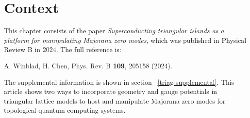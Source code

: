 \section{Context}

This chapter consists of the paper \textit{Superconducting triangular islands as a platform for manipulating Majorana zero modes}, which was published in Physical Review B in 2024. The full reference is:

A. Winblad, H. Chen, Phys. Rev. B \textbf{109}, 205158 (2024).

The supplemental information is shown in section ~\ref{triag-supplemental}.
This article shows two ways to incorporate geometry and gauge potentials in triangular lattice models to host and manipulate Majorana zero modes for topological quantum computing systems.
